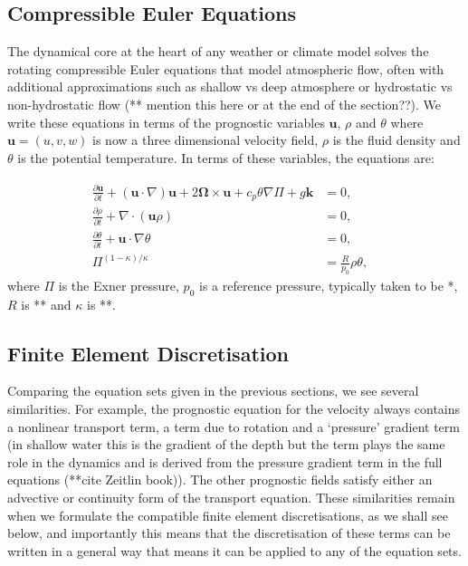 \documentclass[journal abbreviation, manuscript]{copernicus}
\def\MM#1{\boldsymbol{#1}}
\newcommand{\pp}[2]{\frac{\partial #1}{\partial #2}}
\begin{document}
\subsection{Compressible Euler Equations}
The dynamical core at the heart of any weather or climate model solves
the rotating compressible Euler equations that model atmospheric flow,
often with additional approximations such as shallow vs deep
atmosphere or hydrostatic vs non-hydrostatic flow (** mention this
here or at the end of the section??). We write these equations in
terms of the prognostic variables $\MM{u}$, $\rho$ and $\theta$ where
$\MM{u}=(u, v, w)$ is now a three dimensional velocity field, $\rho$
is the fluid density and $\theta$ is the potential temperature. In
terms of these variables, the equations are:

\begin{align}
  \pp{\MM{u}}{t} + 
  (\MM{u}\cdot\nabla)\MM{u} +
  2\MM{\Omega}\times \MM{u} + c_p\theta\nabla \Pi + g\hat{\MM{k}} & = 0, \\
  \pp{\rho}{t} + \nabla\cdot(\MM{u}\rho) & = 0, \\
  \pp{\theta}{t} + \MM{u}\cdot\nabla\theta & = 0, \\
  \Pi^{(1-\kappa)/\kappa} & = \frac{R}{p_0}\rho\theta, & 
\end{align}
where $\Pi$ is the Exner pressure, $p_0$ is a reference pressure,
typically taken to be *, $R$ is ** and $\kappa$ is **.

\subsection{Finite Element Discretisation}
\label{sec: FEM}

Comparing the equation sets given in the previous sections, we see
several similarities. For example, the prognostic equation for the
velocity always contains a nonlinear transport term, a term due to
rotation and a `pressure' gradient term (in shallow water this is the
gradient of the depth but the term plays the same role in the dynamics
and is derived from the pressure gradient term in the full equations
(**cite Zeitlin book)). The other prognostic fields satisfy either an
advective or continuity form of the transport equation. These
similarities remain when we formulate the compatible finite element
discretisations, as we shall see below, and importantly this means
that the discretisation of these terms can be written in a general way
that means it can be applied to any of the equation sets.
\end{document}
